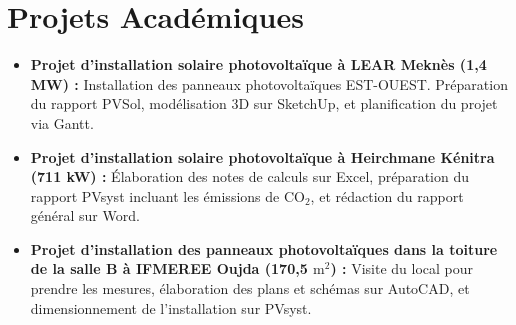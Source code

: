 \documentclass[9.5pt, a4paper]{article}
\begin{document}
\section{Projets Académiques}
\begin{itemize}[leftmargin=1.5em, label=---, itemsep=1pt, topsep=1pt]
    \item \textbf{Projet d'installation solaire photovoltaïque à LEAR Meknès (1,4 MW) :} Installation des panneaux photovoltaïques EST-OUEST. Préparation du rapport PVSol, modélisation 3D sur SketchUp, et planification du projet via Gantt.
    \item \textbf{Projet d'installation solaire photovoltaïque à Heirchmane Kénitra (711 kW) :} Élaboration des notes de calculs sur Excel, préparation du rapport PVsyst incluant les émissions de $\text{CO}_2$, et rédaction du rapport général sur Word.
    \item \textbf{Projet d'installation des panneaux photovoltaïques dans la toiture de la salle B à IFMEREE Oujda (170,5 $\text{m}^2$) :} Visite du local pour prendre les mesures, élaboration des plans et schémas sur AutoCAD, et dimensionnement de l'installation sur PVsyst.
\end{itemize}

\end{document}
